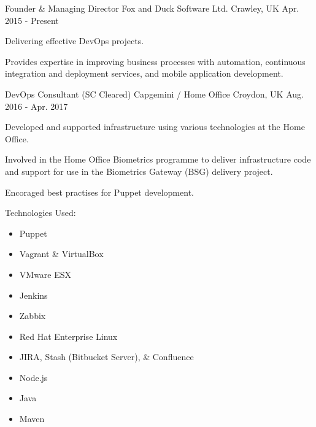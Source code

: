

\begin{cventries}

	\cventry
	{Founder \& Managing Director} %
	{Fox and Duck Software Ltd.} %
	{Crawley, UK} %
	{Apr. 2015 - Present} %
	{
		\begin{cvitems} %
		\item {Delivering effective DevOps projects.}
		\item {Provides expertise in improving business processes with automation, continuous integration and deployment services, and mobile application development.}
		\end{cvitems}
	}

	\cventry
	{DevOps Consultant (SC Cleared)} %
	{Capgemini / Home Office} %
	{Croydon, UK} %
	{Aug. 2016 - Apr. 2017} %
	{
		\begin{cvitems} %
		\item {Developed and supported infrastructure using various technologies at the Home Office.}
		\item {Involved in the Home Office Biometrics programme to deliver infrastructure code and support for use in the Biometrics Gateway (BSG) delivery project.}
		\item {Encoraged best practises for Puppet development.}
		\item {Technologies Used: }
			\begin{itemize}
				\item {Puppet}
				\item {Vagrant \& VirtualBox}
				\item {VMware ESX}
				\item {Jenkins}
				\item {Zabbix}
				\item {Red Hat Enterprise Linux}
				\item {JIRA, Stash (Bitbucket Server), \& Confluence}
				\item {Node.js}
				\item {Java}
				\item {Maven}
			\end{itemize}
		\end{cvitems}
	}


\end{cventries}
